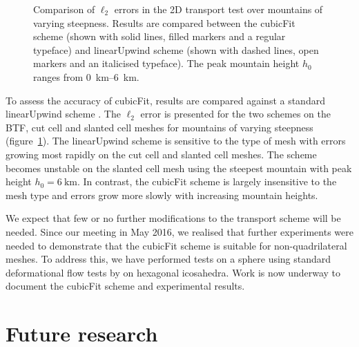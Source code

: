 \documentclass[a4paper,11pt]{article}
\begin{document}
\begin{figure}
	\centering
	
	\caption{Comparison of $\ell_2$ errors in the 2D transport test over mountains of varying steepness.  Results are compared between the cubicFit scheme (shown with solid lines, filled markers and a regular typeface) and linearUpwind scheme (shown with dashed lines, open markers and an italicised typeface).  The peak mountain height $h_0$ ranges from \SIrange{0}{6}{\kilo\meter}.}
	\label{fig:mountainAdvection-errors}
\end{figure}

To assess the accuracy of cubicFit, results are compared against a standard linearUpwind scheme .
The $\ell_2$ error is presented for the two schemes on the BTF, cut cell and slanted cell meshes for mountains of varying steepness (figure~\ref{fig:mountainAdvection-errors}).
The linearUpwind scheme is sensitive to the type of mesh with errors growing most rapidly on the cut cell and slanted cell meshes.  The scheme becomes unstable on the slanted cell mesh using the steepest mountain with peak height $h_0 = \SI{6}{\kilo\meter}$.
In contrast, the cubicFit scheme is largely insensitive to the mesh type and errors grow more slowly with increasing mountain heights.

We expect that few or no further modifications to the transport scheme will be needed.   Since our meeting in May 2016, we realised that further experiments were needed to demonstrate that the cubicFit scheme is suitable for non-quadrilateral meshes.  To address this, we have performed tests on a sphere using standard deformational flow tests by \citet{lauritzen2012} on hexagonal icosahedra.
Work is now underway to document the cubicFit scheme and experimental results.

\section{Future research}
\label{sec:future}
\end{document}
